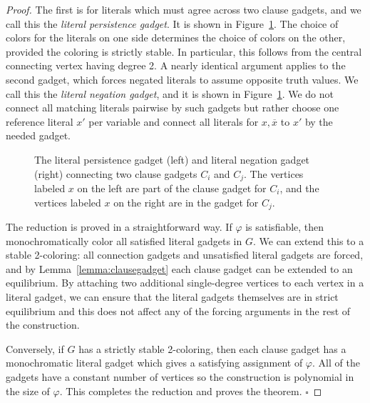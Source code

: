 \documentclass{llncs}
\begin{document}
\begin{proof}
The first is for literals which must agree across two clause gadgets, and we
call this the \emph{literal persistence gadget}. It is shown in
Figure~\ref{fig:connectiongadgets}. The choice of colors for the literals on
one side determines the choice of colors on the other, provided the coloring is
strictly stable. In particular, this follows from the central connecting vertex
having degree 2. A nearly identical argument applies to the second gadget, which forces negated
literals to assume opposite truth values. We call this the \emph{literal
negation gadget}, and it is shown in Figure~\ref{fig:connectiongadgets}. 
We do not connect all matching literals pairwise by such gadgets but rather
choose one reference literal $x'$ per variable and connect all literals for $x,
\overline{x}$ to $x'$ by the needed gadget.

\begin{figure}[htb]
\centering
{}
\caption{The literal persistence gadget (left) and literal negation gadget
(right) connecting two clause gadgets $C_i$ and $C_j$. The vertices labeled $x$
on the left are part of the clause gadget for $C_i$, and the vertices labeled
$x$ on the right are in the gadget for $C_j$.}
\label{fig:connectiongadgets}
\end{figure}

The reduction is proved in a straightforward way. If $\varphi$ is satisfiable,
then monochromatically
color all satisfied literal gadgets in $G$. We can extend this to a
stable 2-coloring: all connection gadgets and unsatisfied literal gadgets are forced, and by
Lemma~\ref{lemma:clausegadget} each clause gadget can be extended to an
equilibrium. By attaching two additional single-degree vertices to each vertex
in a literal gadget, we can ensure that the literal gadgets themselves are in
strict equilibrium and this does not affect any of the forcing arguments in the
rest of the construction.

Conversely, if $G$ has a strictly stable 2-coloring, then each clause gadget
has a monochromatic literal gadget which gives a satisfying assignment of
$\varphi$. All of the gadgets have a constant number of vertices so the
construction is polynomial in the size of $\varphi$. This completes the
reduction and proves the theorem.
\hfill $\square$
\end{proof}
\end{document}
